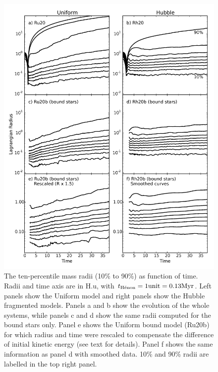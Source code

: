 \begin{figure}
\begin{center}
\includegraphics[width=\textwidth]{Figures/3_Lagr_radius}
\caption[Ten-percentile Lagrangian radii over time for HL fragmented and uniform models]{The ten-percentile mass radii (10\% to 90\%) as function of time. Radii and time axis are in H.u, with $t_{\textrm{H\'enon}} = 1 {\rm unit} =  0.13 {\textrm{Myr}}$. Left panels show the Uniform model and right panels show the Hubble fragmented models. Panels a and b show the evolution of the whole systems, while panels c and d show the same radii computed for the bound stars only. Panel e shows the Uniform bound model (Ru20b) for which radius and time were rescaled to compensate the difference of initial kinetic energy (see text for details). Panel f shows the same information as panel d with smoothed data. 10\% and 90\% radii are labelled in the top right panel.
}
\label{Fig:3_Lagr_radius}
\end{center}
\end{figure}


